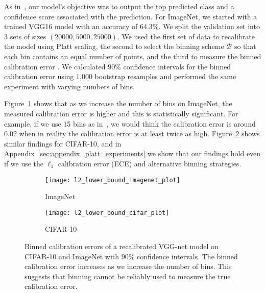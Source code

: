 As in~\cite{guo2017calibration}, our model's objective was to output the top predicted class and a confidence score associated with the prediction. For ImageNet, we started with a trained VGG16 model with an accuracy of 64.3\%. We split the validation set into 3 sets of sizes $(20000, 5000, 25000)$. We used the first set of data to recalibrate the model using Platt scaling, the second to select the binning scheme $\mathcal{B}$ so that each bin contains an equal number of points, and the third to measure the binned calibration error . We calculated $90\%$ confidence intervals for the binned calibration error using 1,000 bootstrap resamples and performed the same experiment with varying numbers of bins.

Figure~\ref{fig:imagenet_lower_bound} shows that as we increase the number of bins on ImageNet, the measured calibration error is higher and this is statistically significant. For example, if we use 15 bins as in~\cite{guo2017calibration}, we would think the calibration error is around 0.02 when in reality the calibration error is at least twice as high. Figure~\ref{fig:cifar_10_lower_bound} shows similar findings for CIFAR-10, and in Appendix~\ref{sec:appendix_platt_experiments} we show that our findings hold even if we use the $\ell_1$ calibration error (ECE) and alternative binning strategies.

\begin{figure}
     \centering
     \begin{subfigure}[b]{0.4\textwidth}
         \centering
         \texttt{[image: l2\_lower\_bound\_imagenet\_plot]}
         \caption{ImageNet}
         \label{fig:imagenet_lower_bound}
     \end{subfigure}
     \hfill
     \begin{subfigure}[b]{0.4\textwidth}
         \centering
         \texttt{[image: l2\_lower\_bound\_cifar\_plot]}
         \caption{CIFAR-10}
         \label{fig:cifar_10_lower_bound}
     \end{subfigure}
        \caption{
          Binned calibration errors of a recalibrated VGG-net model on CIFAR-10 and ImageNet  with $90\%$ confidence intervals. The binned calibration error increases as we increase the number of bins. This suggests that binning cannot be reliably used to measure the true calibration error.
        }
        \label{fig:lower_bounds}
\end{figure}


